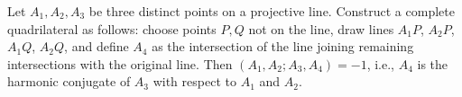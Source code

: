 Let $A_1, A_2, A_3$ be three distinct points on a projective line. Construct a complete quadrilateral as follows: choose points $P, Q$ not on the line, draw lines $A_1P$, $A_2P$, $A_1Q$, $A_2Q$, and define $A_4$ as the intersection of the line joining remaining intersections with the original line. Then $(A_1, A_2; A_3, A_4) = -1$, i.e., $A_4$ is the harmonic conjugate of $A_3$ with respect to $A_1$ and $A_2$.
